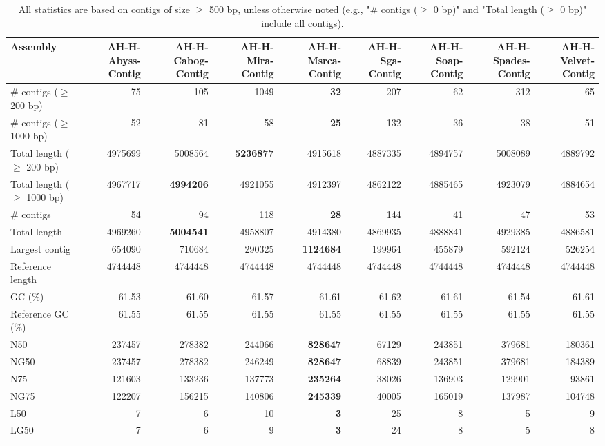 \documentclass[12pt,a4paper]{article}
\begin{document}
\begin{table}[ht]
\begin{center}
\caption{All statistics are based on contigs of size $\geq$ 500 bp, unless otherwise noted (e.g., "\# contigs ($\geq$ 0 bp)" and "Total length ($\geq$ 0 bp)" include all contigs).}
\begin{tabular}{|l*{8}{|r}|}
\hline
Assembly & AH-H-Abyss-Contig & AH-H-Cabog-Contig & AH-H-Mira-Contig & AH-H-Msrca-Contig & AH-H-Sga-Contig & AH-H-Soap-Contig & AH-H-Spades-Contig & AH-H-Velvet-Contig \\ \hline
\# contigs ($\geq$ 200 bp) & 75 & 105 & 1049 & {\bf 32} & 207 & 62 & 312 & 65 \\ \hline
\# contigs ($\geq$ 1000 bp) & 52 & 81 & 58 & {\bf 25} & 132 & 36 & 38 & 51 \\ \hline
Total length ($\geq$ 200 bp) & 4975699 & 5008564 & {\bf 5236877} & 4915618 & 4887335 & 4894757 & 5008089 & 4889792 \\ \hline
Total length ($\geq$ 1000 bp) & 4967717 & {\bf 4994206} & 4921055 & 4912397 & 4862122 & 4885465 & 4923079 & 4884654 \\ \hline
\# contigs & 54 & 94 & 118 & {\bf 28} & 144 & 41 & 47 & 53 \\ \hline
Total length & 4969260 & {\bf 5004541} & 4958807 & 4914380 & 4869935 & 4888841 & 4929385 & 4886581 \\ \hline
Largest contig & 654090 & 710684 & 290325 & {\bf 1124684} & 199964 & 455879 & 592124 & 526254 \\ \hline
Reference length & 4744448 & 4744448 & 4744448 & 4744448 & 4744448 & 4744448 & 4744448 & 4744448 \\ \hline
GC (\%) & 61.53 & 61.60 & 61.57 & 61.61 & 61.62 & 61.61 & 61.54 & 61.61 \\ \hline
Reference GC (\%) & 61.55 & 61.55 & 61.55 & 61.55 & 61.55 & 61.55 & 61.55 & 61.55 \\ \hline
N50 & 237457 & 278382 & 244066 & {\bf 828647} & 67129 & 243851 & 379681 & 180361 \\ \hline
NG50 & 237457 & 278382 & 246249 & {\bf 828647} & 68839 & 243851 & 379681 & 184389 \\ \hline
N75 & 121603 & 133236 & 137773 & {\bf 235264} & 38026 & 136903 & 129901 & 93861 \\ \hline
NG75 & 122207 & 156215 & 140806 & {\bf 245339} & 40005 & 165019 & 137987 & 104748 \\ \hline
L50 & 7 & 6 & 10 & {\bf 3} & 25 & 8 & 5 & 9 \\ \hline
LG50 & 7 & 6 & 9 & {\bf 3} & 24 & 8 & 5 & 8 \\ \hline

\end{tabular}
\end{center}
\end{table}
\end{document}
